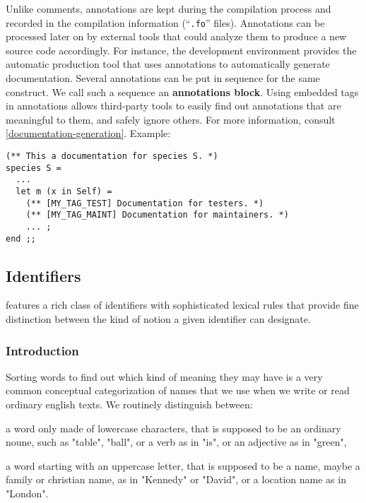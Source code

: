 Unlike comments, annotations are kept during the compilation process
and recorded in the compilation information (``{\tt .fo}'' files). Annotations can
be processed later on by external tools that could analyze them to
produce a new {\focal} source code accordingly.
For instance, the {\focal} development environment provides the {\focdoc}
automatic production tool that uses annotations to automatically generate
documentation.
Several annotations can be put in sequence for the same construct. We call
such a sequence an {\bf annotations block}.
Using embedded tags in annotations allows third-party tools to easily find
out annotations that are meaningful to them, and safely ignore others.
For more information, consult
\ref{documentation-generation}.
Example:
{\scriptsize
\begin{lstlisting}
(** This a documentation for species S. *)
species S =
  ...
  let m (x in Self) =
    (** [MY_TAG_TEST] Documentation for testers. *)
    (** [MY_TAG_MAINT] Documentation for maintainers. *)
    ... ;
end ;;
\end{lstlisting}
}

\subsection{Identifiers}
\vspace{0.2cm}

{\focal} features a rich class of identifiers with sophisticated lexical
rules that provide fine distinction between the kind of notion a given
identifier can designate.

\subsubsection{Introduction}

Sorting words to find out which kind of meaning they may have is a very common
conceptual categorization of names that we use when we write or read ordinary
english texts. We routinely distinguish between:
\begin{citemize}
\item a word only made of lowercase characters, that is supposed to be an
  ordinary noune, such as "table", "ball", or a verb as in "is", or an
  adjective as in "green",
\item a word starting with an uppercase letter, that is supposed to be a name,
  maybe a family or christian name, as in "Kennedy" or "David", or a location
  name as in "London".
\end{citemize}

